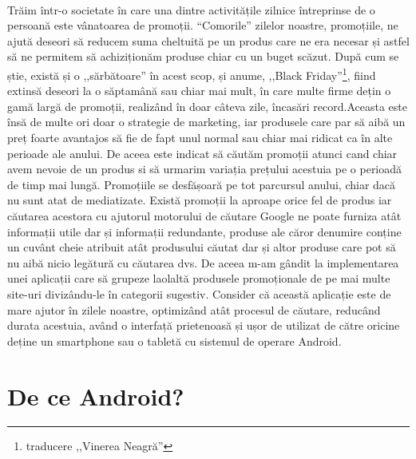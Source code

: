 \paragraph{ }Trăim într-o societate în care una dintre activitățile zilnice întreprinse de o persoană este vânatoarea de promoții. ``Comorile'' zilelor noastre, promoțiile, ne ajută deseori să reducem suma cheltuită pe un produs care ne era necesar și astfel să ne permitem să achiziționăm produse chiar cu un buget scăzut.\newline 
După cum se știe, există și o ,,sărbătoare'' în acest scop, și anume, ,,Black Friday''\footnote{traducere ,,Vinerea Neagră''}, fiind extinsă deseori la o săptamână sau chiar mai mult, în care multe firme dețin o gamă largă de promoții, realizând în doar câteva zile, încasări record.\newpage Aceasta este însă de multe ori doar o strategie de marketing, iar produsele care par să aibă un preț foarte avantajos să fie de fapt unul normal sau chiar mai ridicat ca în alte perioade ale anului. De aceea este indicat să căutăm promoții atunci cand chiar avem nevoie de un produs si să urmarim variația prețului acestuia pe o perioadă de timp mai lungă. Promoțiile se desfășoară pe tot parcursul anului, chiar dacă nu sunt atat de mediatizate.\newline
 Există promoții la aproape orice fel de produs iar căutarea acestora cu ajutorul motorului de căutare Google ne poate furniza atât informații utile dar și informații redundante, produse ale căror denumire conține un cuvânt cheie atribuit atât  produsului căutat dar și altor produse care pot să nu aibă nicio legătură cu căutarea dvs. De aceea m-am gândit la implementarea unei aplicații care să grupeze laolaltă produsele promoționale de pe mai multe site-uri divizându-le în categorii sugestiv.\newline
 Consider că această aplicație este de mare ajutor în zilele noastre, optimizând atât procesul de căutare, reducând durata acestuia, având o interfață prietenoasă și ușor de utilizat de către oricine deține un smartphone sau o tabletă cu sistemul de operare Android.\bigskip

\section{De ce Android?}
